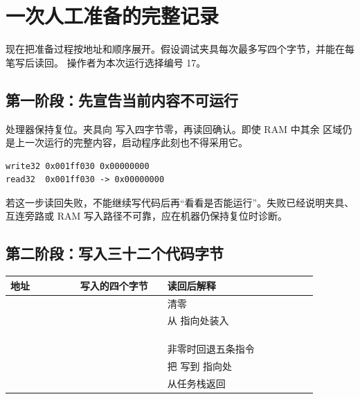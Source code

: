 \section{一次人工准备的完整记录}

现在把准备过程按地址和顺序展开。假设调试夹具每次最多写四个字节，并能在每笔写后读回。
操作者为本次运行选择编号 17。

\subsection{第一阶段：先宣告当前内容不可运行}

处理器保持复位。夹具向  写入四字节零，再读回确认。即使 RAM 中其余
区域仍是上一次运行的完整内容，启动程序此刻也不得采用它。

\begin{lstlisting}
write32 0x001ff030 0x00000000
read32  0x001ff030 -> 0x00000000
\end{lstlisting}

若这一步读回失败，不能继续写代码后再“看看是否能运行”。失败已经说明夹具、互连旁路或
RAM 写入路径不可靠，应在机器仍保持复位时诊断。

\subsection{第二阶段：写入三十二个代码字节}

\begin{longtable}{|L{0.20\linewidth}|L{0.25\linewidth}|L{0.43\linewidth}|}
\hline
{}
地址 & 写入的四个字节 & 读回后解释 \\ \hline
{} &  & 清零  \\ \hline
{} &  & 从  指向处装入  \\ \hline
{} &  &  \\ \hline
{} &  &  \\ \hline
{} &  &  \\ \hline
{} &  & 非零时回退五条指令 \\ \hline
{} &  & 把  写到  指向处 \\ \hline
{} &  & 从任务栈返回 \\ \hline
\end{longtable}

